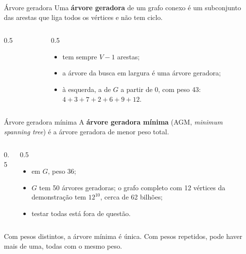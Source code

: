 \documentclass{beamer}
\begin{document}
\begin{frame}{Árvore geradora}
	Uma \textbf{árvore geradora} de um grafo conexo é um subconjunto das arestas
	que liga todos os vértices e não tem ciclo.

	\begin{columns}[c]
		\begin{column}{0.5\textwidth}
			\begin{center}
				\scalebox{0.7}{\grafoGPbfs}
			\end{center}
		\end{column}
		\begin{column}{0.5\textwidth}
			\small
			\begin{itemize}
				\item tem sempre $V - 1$ arestas;
				\item a árvore da busca em largura é uma árvore geradora;
				\item à esquerda, a de $G$ a partir de 0, com peso 43:
				      \\ $4 + 3 + 7 + 2 + 6 + 9 + 12$.
			\end{itemize}
		\end{column}
	\end{columns}
\end{frame}

\begin{frame}{Árvore geradora mínima}
	A \textbf{árvore geradora mínima} (AGM, \emph{minimum spanning tree}) é a
	árvore geradora de menor peso total.

	\begin{columns}[c]
		\begin{column}{0.5\textwidth}
			\begin{center}
				\scalebox{0.7}{\grafoGPagm}
			\end{center}
		\end{column}
		\begin{column}{0.5\textwidth}
			\small
			\begin{itemize}
				\item em $G$, peso 36;
				\item $G$ tem 50 árvores geradoras; o grafo completo com 12
				      vértices da demonstração tem $12^{10}$, cerca de 62 bilhões;
				\item testar todas está fora de questão.
			\end{itemize}
		\end{column}
	\end{columns}

	\vspace{0.2cm}
	\footnotesize
	Com pesos distintos, a árvore mínima é única. Com pesos repetidos, pode
	haver mais de uma, todas com o mesmo peso.
\end{frame}
\end{document}
